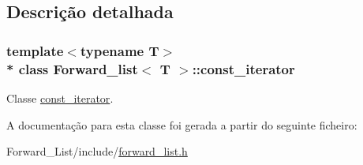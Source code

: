 \subsection{Descrição detalhada}
\subsubsection*{template$<$typename T$>$\\*
class Forward\+\_\+list$<$ T $>$\+::const\+\_\+iterator}

Classe \hyperlink{class_forward__list_1_1const__iterator}{const\+\_\+iterator}. 

A documentação para esta classe foi gerada a partir do seguinte ficheiro\+:\begin{DoxyCompactItemize}
\item 
Forward\+\_\+\+List/include/\hyperlink{forward__list_8h}{forward\+\_\+list.\+h}\end{DoxyCompactItemize}
